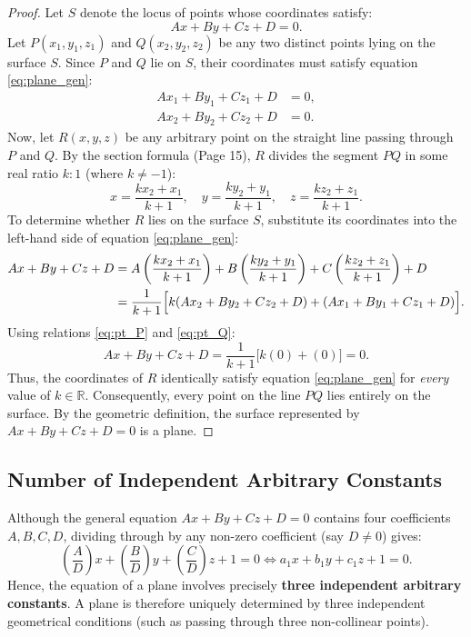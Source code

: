 \begin{proof}
Let $S$ denote the locus of points whose coordinates satisfy:
\begin{equation}
    Ax + By + Cz + D = 0. \label{eq:plane_gen}
\end{equation}
Let $P(x_1, y_1, z_1)$ and $Q(x_2, y_2, z_2)$ be any two distinct points lying on the surface $S$.
Since $P$ and $Q$ lie on $S$, their coordinates must satisfy equation \eqref{eq:plane_gen}:
\begin{align}
    Ax_1 + By_1 + Cz_1 + D &= 0, \label{eq:pt_P} \\
    Ax_2 + By_2 + Cz_2 + D &= 0. \label{eq:pt_Q}
\end{align}
Now, let $R(x, y, z)$ be any arbitrary point on the straight line passing through $P$ and $Q$.
By the section formula (Page 15), $R$ divides the segment $PQ$ in some real ratio $k : 1$ (where $k \neq -1$):
\begin{equation}
    x = \frac{k x_2 + x_1}{k + 1}, \quad y = \frac{k y_2 + y_1}{k + 1}, \quad z = \frac{k z_2 + z_1}{k + 1}. \label{eq:pt_R_coords}
\end{equation}
To determine whether $R$ lies on the surface $S$, substitute its coordinates into the left-hand side of equation \eqref{eq:plane_gen}:
\begin{align}
    Ax + By + Cz + D &= A\left(\frac{k x_2 + x_1}{k + 1}\right) + B\left(\frac{k y_2 + y_1}{k + 1}\right) + C\left(\frac{k z_2 + z_1}{k + 1}\right) + D \nonumber\\
    &= \frac{1}{k + 1} \Bigl[ k(A x_2 + B y_2 + C z_2 + D) + (A x_1 + B y_1 + C z_1 + D) \Bigr].
\end{align}
Using relations \eqref{eq:pt_P} and \eqref{eq:pt_Q}:
\begin{equation}
    Ax + By + Cz + D = \frac{1}{k + 1} \bigl[ k(0) + (0) \bigr] = 0.
\end{equation}
Thus, the coordinates of $R$ identically satisfy equation \eqref{eq:plane_gen} for \emph{every} value of $k \in \mathbb{R}$.
Consequently, every point on the line $PQ$ lies entirely on the surface.
By the geometric definition, the surface represented by $Ax + By + Cz + D = 0$ is a plane.
\end{proof}

\subsection{Number of Independent Arbitrary Constants}
Although the general equation $Ax + By + Cz + D = 0$ contains four coefficients $A, B, C, D$, dividing through by any non-zero coefficient (say $D \neq 0$) gives:
\begin{equation}
    \left(\frac{A}{D}\right)x + \left(\frac{B}{D}\right)y + \left(\frac{C}{D}\right)z + 1 = 0 \iff a_1 x + b_1 y + c_1 z + 1 = 0.
\end{equation}
Hence, the equation of a plane involves precisely \textbf{three independent arbitrary constants}.
A plane is therefore uniquely determined by three independent geometrical conditions (such as passing through three non-collinear points).

